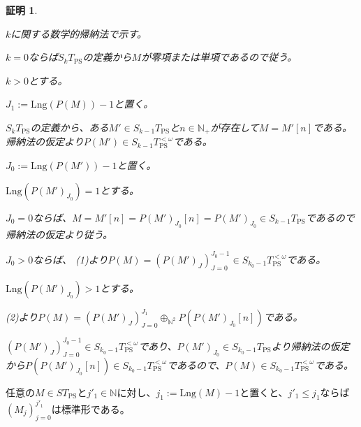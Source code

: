 \documentclass[dvipdfmx,uplatex]{jsarticle}
\theoremstyle{customnonumberbreakfortheorem}
\theoremstyle{customnonumberbreakforproof}
\newtheorem{hideableproof}{証明}
\begin{document}
\begin{hideableproof}
	\begin{indented}
		\item \(k\)に関する数学的帰納法で示す。
		\item \(k = 0\)ならば\(S_kT_{\textrm{PS}}\)の定義から\(M\)が零項または単項であるので従う。
		\item \(k > 0\)とする。
		\begin{indented}
			\item \(J_1 := \textrm{Lng}(P(M))-1\)と置く。
			\item \(S_kT_{\textrm{PS}}\)の定義から、ある\(M' \in S_{k-1}T_{\textrm{PS}}\)と\(n \in \mathbb{N}_{+}\)が存在して\(M = M'[n]\)である。帰納法の仮定より\(P(M') \in S_{k-1}T_{\textrm{PS}}^{< \omega}\)である。
			\item \(J_0 := \textrm{Lng}(P(M'))-1\)と置く。
			\item \(\textrm{Lng}(P(M')_{J_0}) = 1\)とする。
			\begin{indented}
				\item \(J_0 = 0\)ならば、\(M = M'[n] = P(M')_{J_0}[n] = P(M')_{J_0} \in S_{k-1}T_{\textrm{PS}}\)であるので帰納法の仮定より従う。
				\item \(J_0 > 0\)ならば、 (1)より\(P(M) = (P(M')_J)_{J=0}^{J_0-1} \in S_{k_0-1}T_{\textrm{PS}}^{< \omega}\)である。
			\end{indented}
			\item \(\textrm{Lng}(P(M')_{J_0}) > 1\)とする。
			\begin{indented}
				\item {} (2)より\(P(M) = (P(M')_J)_{J=0}^{J_1} \oplus_{\mathbb{N}^2} P(P(M')_{J_0}[n])\)である。
				\item \((P(M')_J)_{J=0}^{J_0-1} \in S_{k_0-1}T_{\textrm{PS}}^{< \omega}\)であり、\(P(M')_{J_0} \in S_{k_0-1}T_{\textrm{PS}}\)より帰納法の仮定から\(P(P(M')_{J_0}[n]) \in S_{k_0-1}T_{\textrm{PS}}^{< \omega}\)であるので、\(P(M) \in S_{k_0-1}T_{\textrm{PS}}^{< \omega}\)である。
			\end{indented}
		\end{indented}
	\end{indented}
\end{hideableproof}

\begin{proposition}[標準形の始切片への遺伝性]\label{標準形の始切片への遺伝性}
	任意の\(M \in ST_{\textrm{PS}}\)と\(j'_1 \in \mathbb{N}\)に対し、\(j_1 := \textrm{Lng}(M)-1\)と置くと、\(j'_1 \leq j_1\)ならば\((M_j)_{j=0}^{j'_1}\)は標準形である。
\end{proposition}
\end{document}
